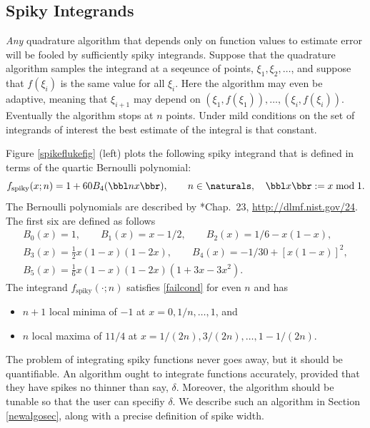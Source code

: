 \documentclass[]{amsart}
\theoremstyle{definition}
\theoremstyle{remark}
\begin{document}
\subsection{Spiky Integrands} \emph{Any} quadrature algorithm that depends only on function values to estimate error will be fooled by sufficiently spiky integrands.  Suppose that the quadrature algorithm samples the integrand at a seqeunce of points, $\xi_1, \xi_2, \ldots$, and suppose that $f(\xi_i)$ is the same value for all $\xi_i$.  Here the algorithm may even be adaptive, meaning that $\xi_{i+1}$ may depend on $(\xi_1, f(\xi_1)), \ldots, (\xi_i, f(\xi_i))$.  Eventually the algorithm stops at $n$ points.  Under mild conditions on the set of integrands of interest the best estimate of the integral is that constant. 

Figure \ref{spikeflukefig} (left) plots the following spiky integrand that is defined in terms of the quartic Bernoulli polynomial:
\begin{equation} \label{spiky}
f_{\text{spiky}}(x;n) = 1 + 60 B_4(\bbl nx \bbr), \qquad n \in \naturals, \quad \bbl x \bbr := x \bmod 1.
\end{equation}
The Bernoulli polynomials are described by *{Chap.\ 23, \url{http://dlmf.nist.gov/24}}.  The first six are defined as follows 
\begin{subequations} \label{Bernoulli}
\begin{gather} 
B_0(x) = 1, \qquad B_1(x) = x-1/2,  \qquad 
B_2(x)=1/6 - x(1-x), \\ 
B_3(x) = \frac{1}{2} x(1-x)(1-2x), \qquad B_4(x) = -1/30 + [x(1-x)]^2, \\
B_5(x) = \frac{1}{6} x(1-x)(1-2x)(1 + 3 x - 3 x^2).
\end{gather}
\end{subequations}
The integrand $f_{\text{spiky}}(\cdot;n)$ satisfies \eqref{failcond} for even $n$ and has 
\begin{itemize}
\item $n+1$ local minima of $-1$ at $x=0, 1/n, \ldots, 1$, and
\item $n$ local maxima of $11/4$ at $x=1/(2n), 3/(2n), \ldots, 1-1/(2n)$.
\end{itemize}

The problem of integrating spiky functions never goes away, but it should be quantifiable.  An algorithm ought to integrate functions accurately, provided that they have spikes no thinner than say, $\delta$.  Moreover, the algorithm should be tunable so that the user can specifiy $\delta$.  We describe such an algorithm in Section \ref{newalgosec}, along with a precise definition of spike width.
\end{document}
